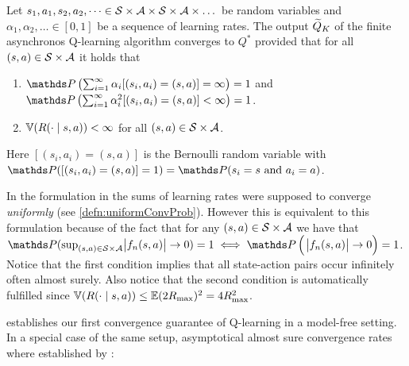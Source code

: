 \begin{thm}
  Let $s_1, a_1, s_2, a_2, \dots \in
  \mathcal{S} \times \mathcal{A} \times \mathcal{S} \times \mathcal{A} \times \dots$
  be random variables and $\alpha_1, \alpha_2, \dots \in [0,1]$
  be a sequence of learning rates.
  The output $\widetilde{Q}_K$ of the finite asynchronos Q-learning algorithm
  converges to $Q^*$ provided that for all $(s, a) \in \mathcal{S} \times \mathcal{A}$
  it holds that
  \begin{enumerate}
    \item $\Prob\left(\sum_{i=1}^\infty \alpha_i
      [(s_i, a_i) = (s,a)] = \infty \right) = 1$
      and
      $\Prob\left(\sum_{i=1}^\infty \alpha_i^2
      [(s_i, a_i) = (s,a)] < \infty\right) = 1$.
    \item $\mathbb{V}(R(\cdot \mid s, a)) < \infty$ for all $(s, a) \in
      \mathcal{S}\times\mathcal{A}$.
  \end{enumerate}
  Here $[(s_i, a_i) = (s, a)]$ is the Bernoulli random variable with
  $\Prob([(s_i, a_i) = (s, a)] = 1) = \Prob(s_i = s \text{ and } a_i = a)$.
  \label{thm:watkinsdayan}
\end{thm}
\begin{rem}
  In the formulation in 
  the sums of learning rates were supposed to
  converge \emph{uniformly} (see \cref{defn:uniformConvProb}).
  However this is equivalent to this formulation
  because of the fact that for any $(s, a) \in \mathcal{S} \times \mathcal{A}$
  we have that
  $\Prob(\sup_{(s, a) \in \cl{S} \times \cl{A}} \abs{f_n(s, a)} \to 0) = 1 \iff
  \Prob\left(\;\abs{f_n(s, a)} \to 0 \right) = 1$.
  Notice that the first condition implies that all state-action pairs
  occur infinitely often almost surely.
  Also notice that the second condition is automatically fulfilled 
  since $\mathbb{V}(R(\cdot \mid s, a)) \leq \mathbb{E} (2R_{\max})^2 = 4 R_{\max}^2$.
\end{rem}

 establishes our first convergence guarantee of Q-learning
in a model-free setting.
In a special case of the same setup, asymptotical almost sure
convergence rates where established by :


